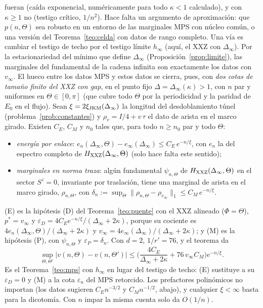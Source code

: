 \documentclass[11pt,a4paper]{article}
\theoremstyle{remark}
\begin{document}
\begin{enumerate}
  fueran (caída exponencial, numéricamente para todo $\kappa<1$ calculado), y con $\kappa\ge1$ no
  (testigo crítico, $1/n^2$). Hace falta
  un argumento de aproximación: que $p(n,\Theta)$ sea robusto en un entorno de las marginales MPS con
  núcleo común, o una versión del Teorema~\ref{teo:celda} con datos de rango completo. Una vía es
  cambiar el testigo de techo por el testigo límite $h_\infty$ (aquí, el XXZ con $\Delta_\infty$).
  Por la estacionariedad del mínimo que define $\Delta_\infty$ (Proposición~\ref{prop:limite}), las marginales del
  fundamental de la cadena infinita son exactamente los datos con $v_\infty$. El hueco entre los
  datos MPS y estos datos se cierra, pues, con \emph{dos cotas de tamaño finito del XXZ con gap}, en
  el punto fijo $\Delta=\Delta_\infty(\kappa)>1$, con $n$ par y uniformes en $\Theta\in[0,\pi]$ (que
  cubre todo $\Theta$ por la periodicidad y la paridad de $E_0$ en el flujo). Sean
  $\xi=2\xi_{\rm JKM}(\Delta_\infty)$ la longitud del desdoblamiento túnel
  (problema~\ref{prob:constantes}) y $\rho_{v}=I/4+v\,\tau$ el dato de arista en el marco girado.
  Existen $C_E$, $C_M$ y $n_0$ tales que, para todo $n\ge n_0$ par y todo $\Theta$:
  \begin{itemize}
  \item[(E)] \emph{energía por enlace}: $e_n(\Delta_\infty,\Theta)-e_\infty(\Delta_\infty)\le C_E\,e^{-n/\xi}$,
    con $e_n$ la del espectro completo de $H_{\rm XXZ}(\Delta_\infty,\Theta)$ (solo hace falta
    este sentido);
  \item[(M)] \emph{marginales en norma traza}: algún fundamental $\psi_{n,\Theta}$ de
    $H_{\rm XXZ}(\Delta_\infty,\Theta)$ en el sector $S^z=0$, invariante por traslación, tiene una
    marginal de arista en el marco girado, $\rho_{n,\Theta}$, con
    $\delta_n:=\sup_\Theta\|\rho_{n,\Theta}-\rho_{v_\infty}\|_1\le C_M\,e^{-n/\xi}$.
  \end{itemize}
  (E) es la hipótesis (D) del Teorema~\ref{teo:puente} con el XXZ alineado ($\Phi=\Theta$),
  $p^\ast=v_\infty$ y $\varepsilon_D=4C_Ee^{-n/\xi}/(\Delta_\infty+2\kappa)$, porque su cociente es
  $4e_n(\Delta_\infty,\Theta)/(\Delta_\infty+2\kappa)$ y $v_\infty=4e_\infty(\Delta_\infty)/(\Delta_\infty+2\kappa)$;
  y (M) es la hipótesis (P), con $\psi_{n,\Theta}$ y $\varepsilon_P=\delta_n$. Con $d=2$, $1/r'=76$, y el
  teorema da
  \[
    \sup_{\Theta,\Theta'}|v(n,\Theta)-v(n,\Theta')|\le\Big(\frac{4C_E}{\Delta_\infty+2\kappa}+76\,v_\infty C_M\Big)e^{-n/\xi}.
  \]
  Es el Teorema~\ref{teo:mps} con $h_\infty$ en lugar del testigo de techo: (E) sustituye a su
  $\varepsilon_D=0$ y (M) a la cota $\varepsilon_n$ del MPS retorcido. Los
  prefactores polinómicos no importan (los datos sugieren $C_En^{-3/2}$ y $C_Mn^{-1/2}$, abajo), y
  cualquier $\xi<\infty$ basta para la dicotomía. Con $n$ impar la misma cuenta solo da $O(1/n)$.


\end{enumerate}
\end{document}

